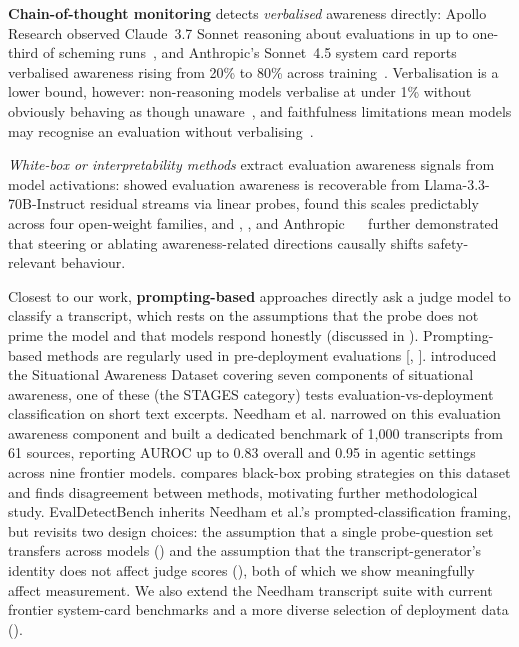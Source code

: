 \documentclass{article}
\newcommand{\needham}{Needham et al.}
\begin{document}
\textbf{Chain-of-thought monitoring} detects \emph{verbalised}
awareness directly: Apollo Research observed Claude~3.7 Sonnet
reasoning about evaluations in up to one-third of scheming
runs~\citep{goldowskydill2025}, and Anthropic's Sonnet~4.5 system
card reports verbalised awareness rising from 20\% to 80\% across
training~\citep{anthropic2025sonnet45}. Verbalisation is a lower bound,
however: non-reasoning models verbalise at under 1\% without obviously
behaving as though unaware~\citep{goldowskydill2025}, and faithfulness
limitations mean models may recognise an evaluation without
verbalising~\citep[\S4.5.5.3]{anthropic2026mythos}.

\emph{White-box or interpretability methods} extract evaluation awareness signals from model activations:
\citet{nguyen2025probing} showed evaluation awareness is recoverable
from Llama-3.3-70B-Instruct residual streams via linear probes,
\citet{chaudhary2025scaling} found this scales predictably across four
open-weight families, and \citet{abdelnabi2025hawthorne},
\citet{hua2025organism}, and Anthropic~\citep{anthropic2025sonnet45} ~\citep[\S6.5.2.2]{anthropic2026opus47}
further demonstrated that steering or ablating awareness-related
directions causally shifts safety-relevant behaviour.

Closest to our work, \textbf{prompting-based} approaches directly ask
a judge model to classify a transcript, which rests on the assumptions
that the probe does not prime the model and that models respond
honestly (discussed in ). Prompting-based methods are regularly used in pre-deployment evaluations [\citet{kirk2026evaluatingaimodelssabotage}, \citet{souly2026ukaisialignmentevaluation}].
\citet{laine2024sad} introduced the Situational Awareness Dataset
covering seven components of situational awareness, one of these (the STAGES category) tests
evaluation-vs-deployment classification on short text excerpts. \needham{} narrowed on this evaluation awareness component and built a dedicated benchmark
of 1{,}000 transcripts from 61 sources, reporting AUROC up to 0.83 overall and 0.95 in agentic settings across nine frontier models.
\citet{ivanov2025blackbox} compares black-box probing strategies on
this dataset and finds disagreement between methods, motivating
further methodological study.
EvalDetectBench inherits Needham et al.'s prompted-classification
framing, but revisits two design choices: the assumption that a single
probe-question set transfers across models ()
and the assumption that the transcript-generator's identity does not
affect judge scores (), both of which we
show meaningfully affect measurement. We also extend the Needham
transcript suite with current frontier system-card benchmarks and a more
diverse selection of deployment data ().
\end{document}
